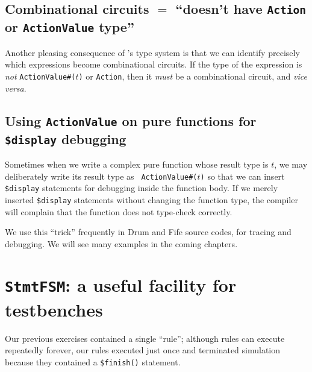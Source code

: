 
\subsection{Combinational circuits $=$ ``doesn't have {\tt Action} or {\tt ActionValue} type''}


Another pleasing consequence of {\BSV}'s type system is that we can
identify precisely which expressions become combinational circuits.
If the type of the expression is \emph{not} {\tt ActionValue\#($t$)}
or {\tt Action}, then it \emph{must} be a combinational circuit, and
\emph{vice versa}.


\subsection{Using {\tt ActionValue} on pure functions for {\tt \$display} debugging}

Sometimes when we write a complex pure function whose result type is
$t$, we may deliberately write its result type as {\tt
ActionValue\#($t$)} so that we can insert \verb|$display| statements
for debugging inside the function body.  If we merely inserted
\verb|$display| statements without changing the function type, the
compiler will complain that the function does not type-check
correctly.

We use this ``trick'' frequently in Drum and Fife source codes, for
tracing and debugging.  We will see many examples in the coming
chapters.


\section{{\tt StmtFSM}: a useful facility for testbenches}

\label{BSV_small_testbench}


Our previous exercises contained a single ``rule''; although rules can
execute repeatedly forever, our rules executed just once and
terminated simulation because they contained a \verb|$finish()|
statement.

